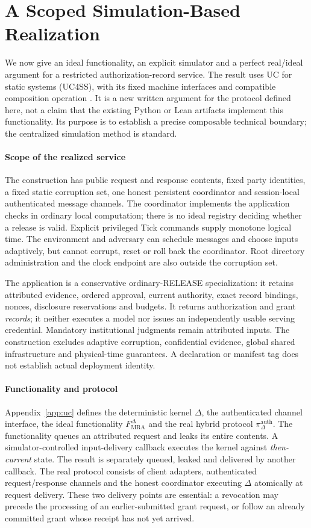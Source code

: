 \section{A Scoped Simulation-Based Realization}
\label{sec:uc}
We now give an ideal functionality, an explicit simulator and a perfect
real/ideal argument for a restricted authorization-record service.
The result uses UC for static systems (UC4SS), with its fixed machine
interfaces and compatible composition operation \citep{canetti2025uc}.
It is a new written argument for the protocol defined here, not a claim
that the existing Python or Lean artifacts implement this functionality.
Its purpose is to establish a precise composable technical boundary;
the centralized simulation method is standard.

\paragraph{Scope of the realized service}
The construction has public request and response contents, fixed party
identities, a fixed static corruption set, one honest persistent coordinator
and session-local authenticated message channels. The coordinator implements
the application checks in ordinary local computation; there is no ideal
registry deciding whether a release is valid. Explicit privileged Tick
commands supply monotone logical time. The environment and adversary can
schedule messages and choose inputs adaptively, but cannot corrupt, reset
or roll back the coordinator. Root directory administration and the clock
endpoint are also outside the corruption set.

The application is a conservative ordinary-RELEASE specialization:
it retains attributed evidence, ordered approval, current authority,
exact record bindings, nonces, disclosure reservations and budgets.
It returns authorization and grant \emph{records}; it neither executes a
model nor issues an independently usable serving credential.
Mandatory institutional judgments remain attributed inputs.
The construction excludes adaptive corruption, confidential evidence,
global shared infrastructure and physical-time guarantees. A declaration
or manifest tag does not establish actual deployment identity.

\paragraph{Functionality and protocol}
Appendix~\ref{app:uc} defines the deterministic kernel $\Delta$, the
authenticated channel interface, the ideal functionality
$F_{\mathrm{MRA}}^\Delta$ and the real hybrid protocol
$\pi_\Delta^{\mathrm{auth}}$.
The functionality queues an attributed request and leaks its entire
contents. A simulator-controlled input-delivery callback executes the
kernel against \emph{then-current} state. The result is separately queued,
leaked and delivered by another callback. The real protocol consists of
client adapters, authenticated request/response channels and the honest
coordinator executing $\Delta$ atomically at request delivery.
These two delivery points are essential: a revocation may precede the
processing of an earlier-submitted grant request, or follow an already
committed grant whose receipt has not yet arrived.

